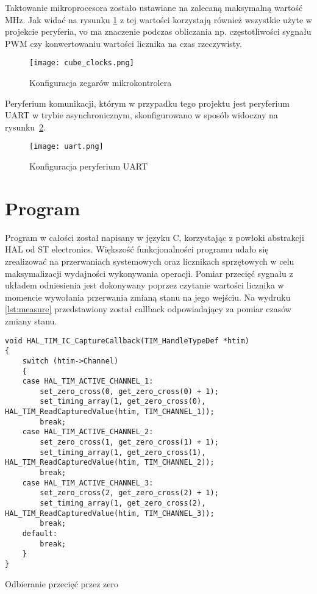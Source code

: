Taktowanie mikroprocesora zostało ustawiane na zalecaną maksymalną wartość \unit[80]{MHz}. 
Jak widać na rysunku \ref{fig:cube_clocks} z tej wartości korzystają również wszystkie użyte w projekcie peryferia, 
vo ma znaczenie podczas obliczania np. częstotliwości sygnału PWM czy konwertowaniu wartości licznika na czas rzeczywisty.

\begin{figure}[ht!]
    \centering
    \texttt{[image: cube\_clocks.png]}
    \caption{Konfiguracja zegarów mikrokontrolera}
    \label{fig:cube_clocks}
\end{figure}

Peryferium komunikacji, którym w przypadku tego projektu jest peryferium UART w trybie asynchronicznym, skonfigurowano w sposób widoczny na rysunku~\ref{fig:uart}.
\begin{figure}[ht!]
    \centering
    \texttt{[image: uart.png]}
    \caption{Konfiguracja peryferium UART}
    \label{fig:uart}
\end{figure}


\clearpage
\section{Program}
Program w całości został napisany w języku C, korzystając z powłoki abstrakcji HAL od ST electronics. 
Większość funkcjonalności programu udało się zrealizować na przerwaniach systemowych oraz licznikach sprzętowych w celu maksymalizacji wydajności wykonywania operacji.
Pomiar przecięć sygnału  z układem odniesienia jest dokonywany poprzez czytanie wartości licznika w momencie wywołania przerwania zmianą stanu na jego wejściu.
Na wydruku \ref{lst:measure} przedstawiony został callback odpowiadający za pomiar czasów zmiany stanu.

\begin{listing}[tp]
    \begin{verbatim}
void HAL_TIM_IC_CaptureCallback(TIM_HandleTypeDef *htim)
{
    switch (htim->Channel)
    {
    case HAL_TIM_ACTIVE_CHANNEL_1:
        set_zero_cross(0, get_zero_cross(0) + 1);
        set_timing_array(1, get_zero_cross(0), HAL_TIM_ReadCapturedValue(htim, TIM_CHANNEL_1));
        break;
    case HAL_TIM_ACTIVE_CHANNEL_2:
        set_zero_cross(1, get_zero_cross(1) + 1);
        set_timing_array(1, get_zero_cross(1), HAL_TIM_ReadCapturedValue(htim, TIM_CHANNEL_2));
        break;
    case HAL_TIM_ACTIVE_CHANNEL_3:
        set_zero_cross(2, get_zero_cross(2) + 1);
        set_timing_array(1, get_zero_cross(2), HAL_TIM_ReadCapturedValue(htim, TIM_CHANNEL_3));
        break;
    default:
        break;
    }
}
    \end{verbatim}
\caption{Odbieranie przecięć przez zero}
\label{lst:measure}
\end{listing}

